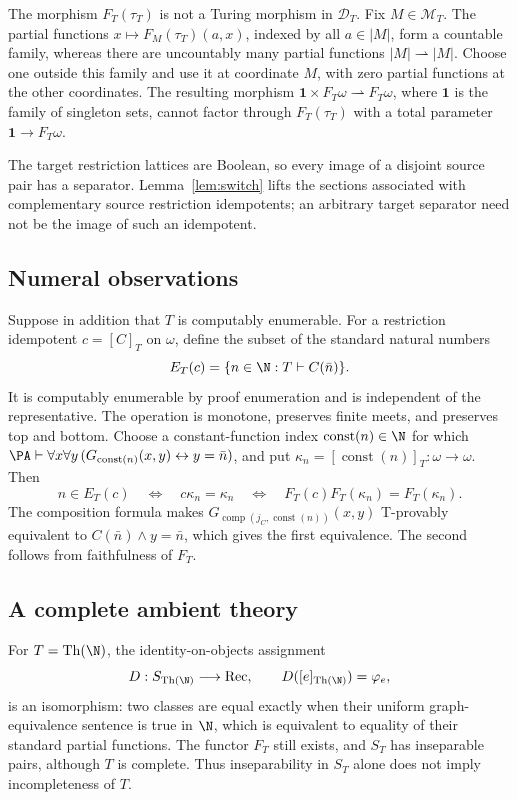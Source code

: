 The morphism $F_T(\tau_T)$ is not a Turing morphism in $\mathcal D_T$.
Fix $M\in\mathcal M_T$. The partial functions
$x\mapsto F_M(\tau_T)(a,x)$, indexed by all $a\in|M|$, form a
countable family, whereas there are uncountably many partial
functions $|M|\rightharpoonup|M|$.
Choose one outside this family and use it at coordinate $M$,
with zero partial functions at the other coordinates.
The resulting morphism
$\mathbf1\times F_T\omega\rightharpoonup F_T\omega$,
where $\mathbf1$ is the family of singleton sets, cannot factor
through $F_T(\tau_T)$ with a total parameter
$\mathbf1\to F_T\omega$.

The target restriction lattices are Boolean, so every image of a disjoint source
pair has a separator. Lemma~\ref{lem:switch} lifts the sections
associated with complementary source restriction idempotents;
an arbitrary target separator need not be the image of such an
idempotent.


\subsection{Numeral observations}

Suppose in addition that $T$ is computably enumerable.
For a restriction idempotent
$c=[C]_T$ on $\omega$, define the subset of the standard natural numbers
\begin{equation}\label{eq:observation}
 E_T(c)=\{n\in\N:T\vdash C(\bar n)\}.
\end{equation}
It is computably enumerable by proof enumeration and is independent of
the representative. The operation is monotone, preserves finite meets,
and preserves top and bottom. Choose a constant-function index
$\operatorname{const}(n)\in\N$ for which
$\PA\vdash\forall x\forall y\,
(G_{\operatorname{const}(n)}(x,y)\leftrightarrow y=\bar n)$, and put
$\kappa_n=[\operatorname{const}(n)]_T:\omega\to\omega$. Then
\begin{equation}\label{eq:faithful-observation}
 n\in E_T(c)
 \quad\Longleftrightarrow\quad c\kappa_n=\kappa_n
 \quad\Longleftrightarrow\quad
 F_T(c)F_T(\kappa_n)=F_T(\kappa_n).
\end{equation}
The composition formula makes
$G_{\operatorname{comp}(j_C,\operatorname{const}(n))}(x,y)$
T-provably equivalent to $C(\bar n)\land y=\bar n$, which gives
the first equivalence.
The second follows from faithfulness of $F_T$.

\subsection{A complete ambient theory}

For $T=\operatorname{Th}(\N)$, the identity-on-objects assignment
\[
 D:S_{\operatorname{Th}(\N)}\longrightarrow\mathrm{Rec},\qquad
 D([e]_{\operatorname{Th}(\N)})=\varphi_e,
\]
is an isomorphism: two classes are equal exactly when their uniform
graph-equivalence sentence is true in $\N$, which is equivalent
to equality of their standard partial functions.
The functor $F_T$ still exists, and $S_T$ has inseparable pairs,
although $T$ is complete.
Thus inseparability in $S_T$ alone does not imply incompleteness of $T$.
